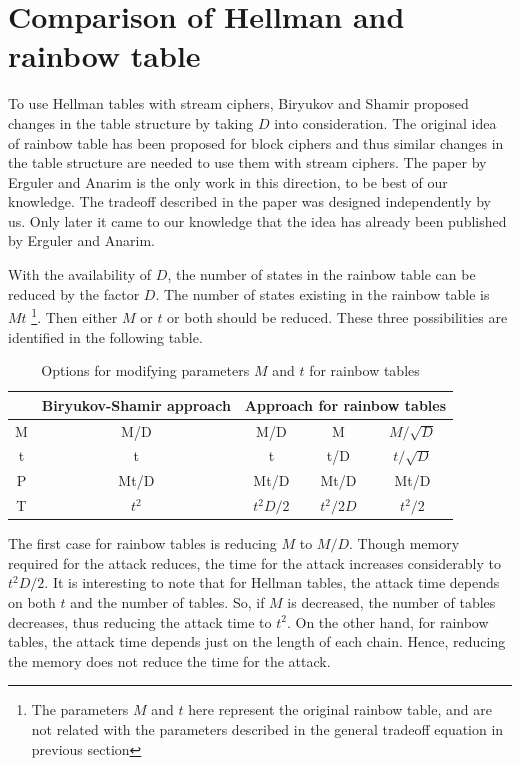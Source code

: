 \section{Comparison of Hellman and rainbow table}
\label{sec:compare-hellman-rainbow}

To use Hellman tables with stream ciphers, Biryukov and Shamir proposed changes in the table structure by taking $D$ into consideration. The original idea of rainbow table has been proposed for block ciphers and thus similar changes in the table structure are needed to use them with stream ciphers. The paper \cite{erguler2005nct} by Erguler and Anarim is the only work in this direction, to be best of our knowledge. The tradeoff described in the paper was designed independently by us. Only later it came to our knowledge that the idea has already been published by Erguler and Anarim.

With the availability of $D$, the number of states in the rainbow table can be reduced by the factor $D$. The number of states existing in the rainbow table is $Mt$ \footnote{The parameters $M$ and $t$ here represent the original rainbow table, and are not related with the parameters described in the general tradeoff equation in previous section}. Then either $M$ or $t$ or both should be reduced. These three possibilities are identified in the following table. 

\begin{table}[ht!]
\begin{center}
\begin{tabular}{|c||c||c c c|}
\hline
			& Biryukov-Shamir approach 	& \multicolumn{3}{c|}{Approach for rainbow tables}					\\ \hline \hline
M			&	M/D		&	M/D				&	M						& $M/\sqrt{D}$	\\
t			&	t			&	t					&	t/D					& $t/\sqrt{D}$	\\ \hline \hline
P			&	Mt/D	&	Mt/D			&	Mt/D				& Mt/D					\\ 
T			&	$t^2$	&	$t^2D/2$	&	$t^2/2D$		& $t^2/2$				\\ \hline
\end{tabular}
\end{center} 
\caption{Options for modifying parameters $M$ and $t$ for rainbow tables}
\label{tab:parameters-rainbow-table}
\end{table}

The first case for rainbow tables is reducing $M$ to $M/D$. Though memory required for the attack reduces, the time for the attack increases considerably to $t^2D/2$. It is interesting to note that for Hellman tables, the attack time depends on both $t$ and the number of tables. So, if $M$ is decreased, the number of tables decreases, thus reducing the attack time to $t^2$. On the other hand, for rainbow tables, the attack time depends just on the length of each chain. Hence, reducing the memory does not reduce the time for the attack.

